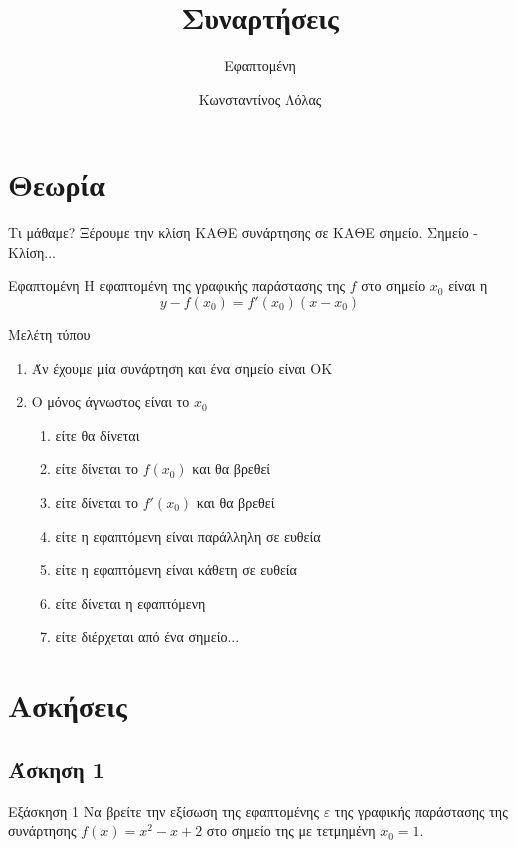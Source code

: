 \documentclass[greek]{beamer}
\title{Συναρτήσεις}
\subtitle{Εφαπτομένη}
\author[Λόλας]{Κωνσταντίνος Λόλας}
\date{}
\begin{document}
\begin{frame}
  \titlepage
\end{frame}

\section{Θεωρία}
\begin{frame}{Τι μάθαμε?}
  Ξέρουμε την κλίση ΚΑΘΕ συνάρτησης σε ΚΑΘΕ σημείο. \pause Σημείο - Κλίση...
  \begin{block}{Εφαπτομένη}
    Η εφαπτομένη της γραφικής παράστασης της $f$ στο σημείο $x_0$ είναι η
    $$y-f(x_0)=f'(x_0)(x-x_0)$$
  \end{block}
\end{frame}

\begin{frame}{Μελέτη τύπου}
  \begin{enumerate}
    \item<1-> Άν έχουμε μία συνάρτηση και ένα σημείο είναι ΟΚ
    \item<2-> Ο μόνος άγνωστος είναι το $x_0$
      \begin{enumerate}
        \item<3-> είτε θα δίνεται
        \item<4-> είτε δίνεται το $f(x_0)$ και θα βρεθεί
        \item<5-> είτε δίνεται το $f'(x_0)$ και θα βρεθεί
        \item<6-> είτε η εφαπτόμενη είναι παράλληλη σε ευθεία
        \item<7-> είτε η εφαπτόμενη είναι κάθετη σε ευθεία
        \item<8-> είτε δίνεται η εφαπτόμενη
        \item<9-> είτε διέρχεται από ένα σημείο...

      \end{enumerate}
  \end{enumerate}
\end{frame}

\section{Ασκήσεις}
\subsection{Άσκηση 1}
\begin{frame}[label=Άσκηση1]{Εξάσκηση 1}
  Να βρείτε την εξίσωση της εφαπτομένης $ε$ της γραφικής παράστασης της συνάρτησης $f(x)=x^2-x+2$ στο σημείο της με τετμημένη $x_0=1$.

\end{frame}
\end{document}
